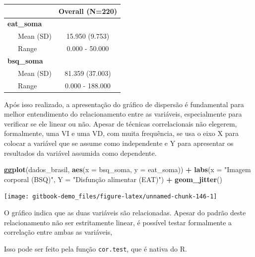\documentclass[
]{book}
\newenvironment{Shaded}{\begin{snugshade}}{\end{snugshade}}
\newcommand{\DataTypeTok}[1]{\textcolor[rgb]{0.13,0.29,0.53}{#1}}
\newcommand{\KeywordTok}[1]{\textcolor[rgb]{0.13,0.29,0.53}{\textbf{#1}}}
\newcommand{\NormalTok}[1]{#1}
\newcommand{\OperatorTok}[1]{\textcolor[rgb]{0.81,0.36,0.00}{\textbf{#1}}}
\newcommand{\StringTok}[1]{\textcolor[rgb]{0.31,0.60,0.02}{#1}}
\begin{document}
\begin{longtable}[]{@{}lc@{}}
\toprule
& Overall (N=220)\tabularnewline
\midrule
\endhead
\textbf{eat\_soma} &\tabularnewline
~~~Mean (SD) & 15.950 (9.753)\tabularnewline
~~~Range & 0.000 - 50.000\tabularnewline
\textbf{bsq\_soma} &\tabularnewline
~~~Mean (SD) & 81.359 (37.003)\tabularnewline
~~~Range & 0.000 - 188.000\tabularnewline
\bottomrule
\end{longtable}

Após isso realizado, a apresentação do gráfico de dispersão é fundamental para melhor entendimento do relacionamento entre as variáveis, especialmente para verificar se ele linear ou não. Apesar de técnicas correlacionais não elegerem, formalmente, uma VI e uma VD, com muita frequência, se usa o eixo X para colocar a variável que se assume como independente e Y para apresentar os resultados da variável assumida como dependente.

\begin{Shaded}
\begin{Highlighting}[]
\KeywordTok{ggplot}\NormalTok{(dados_brasil, }\KeywordTok{aes}\NormalTok{(}\DataTypeTok{x =}\NormalTok{ bsq_soma, }\DataTypeTok{y =}\NormalTok{ eat_soma)) }\OperatorTok{+}
\StringTok{  }\KeywordTok{labs}\NormalTok{(}\DataTypeTok{x =} \StringTok{"Imagem corporal (BSQ)"}\NormalTok{, }
       \DataTypeTok{Y =} \StringTok{"Disfunção alimentar (EAT)"}\NormalTok{) }\OperatorTok{+}
\StringTok{  }\KeywordTok{geom_jitter}\NormalTok{()}
\end{Highlighting}
\end{Shaded}

\begin{center}\texttt{[image: gitbook-demo\_files/figure-latex/unnamed-chunk-146-1]} \end{center}

O gráfico indica que as duas variáveis são relacionadas. Apesar do padrão deste relacionamento não ser estritamente linear, é possível testar formalmente a correlação entre ambas as variáveis,

Isso pode ser feito pela função \texttt{cor.test}, que é nativa do R.

\begin{Shaded}
\end{Shaded}
\end{document}
